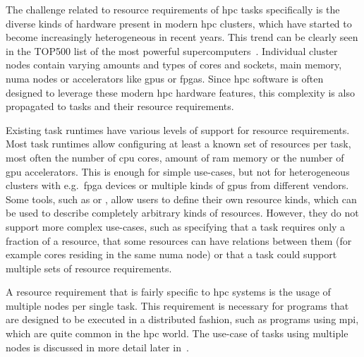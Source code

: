 The challenge related to resource requirements of \gls{hpc} tasks specifically is the
diverse kinds of hardware present in modern \gls{hpc} clusters, which have started to
become increasingly heterogeneous in recent years. This trend can be clearly seen in the TOP500
list of the most powerful supercomputers~\cite{top500analysis}. Individual cluster nodes contain
varying amounts and types of cores and sockets, main memory, \gls{numa} nodes or
accelerators like \glspl{gpu} or \glspl{fpga}. Since \gls{hpc}
software is often designed to leverage these modern \gls{hpc} hardware features, this
complexity is also propagated to tasks and their resource requirements.

Existing task runtimes have various levels of support for resource requirements. Most task runtimes
allow configuring at least a known set of resources per task, most often the number of
\gls{cpu} cores, amount of \gls{ram} memory or the number of
\gls{gpu} accelerators. This is enough for simple use-cases, but not for
heterogeneous clusters with e.g.\ \gls{fpga} devices or multiple kinds of
\glspl{gpu} from different vendors. Some tools, such as \dask{} or
\snakemake{}, allow users to define their own resource kinds, which can be used to
describe completely arbitrary kinds of resources. However, they do not support more complex
use-cases, such as specifying that a task requires only a fraction of a resource, that some
resources can have relations between them (for example cores residing in the same
\gls{numa} node) or that a task could support multiple sets of resource requirements.


A resource requirement that is fairly specific to \gls{hpc} systems is the usage of
multiple nodes per single task. This requirement is necessary for programs that are designed to be
executed in a distributed fashion, such as programs using \gls{mpi}, which are quite
common in the \gls{hpc} world. The use-case of tasks using multiple nodes is
discussed in more detail later in~.


